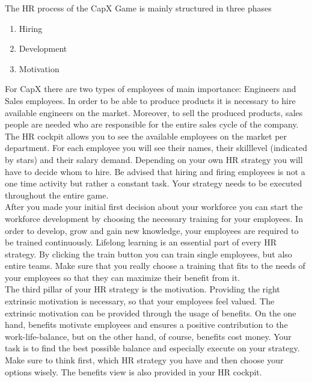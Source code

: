 The HR process of the CapX Game is mainly structured in three phases
\begin{enumerate}
    \item Hiring
    \item Development
    \item Motivation
\end{enumerate}
For CapX there are two types of employees of main importance: Engineers and Sales employees. In order to be able to produce products it is necessary to hire available engineers on the market. Moreover, to sell the produced products, sales people are needed who are responsible for the entire sales cycle of the company.\\
The HR cockpit allows you to see the available employees on the market per department. For each employee you will see their names, their skilllevel (indicated by stars) and their salary demand. Depending on your own HR strategy you will have to decide whom to hire. Be advised that hiring and firing employees is not a one time activity but rather a constant task. Your strategy needs to be executed throughout the entire game. \\
After you made your initial first decision about your workforce you can start the workforce development by choosing the necessary training for your employees. In order to develop, grow and gain new knowledge, your employees are required to be trained continuously. Lifelong learning is an essential part of every HR strategy. By clicking the train button you can train single employees, but also entire teams. Make sure that you really choose a training that fits to the needs of your employees so that they can maximize their benefit from it. \\
The third pillar of your HR strategy is the motivation. Providing the right extrinsic motivation is necessary, so that your employees feel valued. The extrinsic motivation can be provided through the usage of benefits. On the one hand, benefits motivate employees and ensures a positive contribution to the work-life-balance, but on the other hand, of course, benefits cost money. Your task is to find the best possible balance and especially execute on your strategy. Make sure to think first, which HR strategy you have and then choose your options wisely. The benefits view is also provided in your HR cockpit.